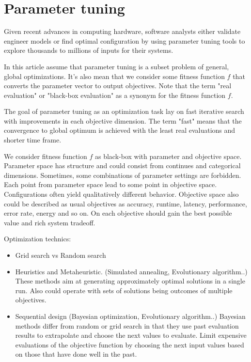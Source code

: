     \section{Parameter tuning}

        Given recent advances in computing hardware, software analysts either validate engineer models or find optimal configuration by using parameter tuning tools to explore thousands to millions of inputs for their systems. 

        In this article assume that parameter tuning is a subset problem of general, global optimizations. It's also mean that we consider some fitness function $f$ that converts the parameter vector to output objectives.  Note that the term "real evaluation" or "black-box evaluation" as a synonym for the fitness function $f$. 
        
        The goal of parameter tuning as an optimization task lay on fast iterative search with improvements in each objective dimension. The term "fast" means that the convergence to global optimum is achieved with the least real evaluations and shorter time frame.

        We consider fitness function $f$ as black-box with parameter and objective space. Parameter space has structure and could consist from continues and categorical dimensions. Sometimes, some combinations of parameter settings are forbidden. Each point from parameter space lead to some point in objective space. Configurations often yield qualitatively different behavior.
        Objective space also could be described as usual objectives as accuracy, runtime, latency, performance, error rate, energy and so on. On each objective should gain the best possible value and rich system tradeoff.

        Optimization technics:
        \begin{itemize}
            \item Grid search vs Random search
            \item Heuristics and Metaheuristic. (Simulated annealing, Evolutionary algorithm..) These methods aim at generating approximately optimal solutions in a single run. Also could operate with sets of solutions being outcomes of multiple objectives.
            \item Sequential design (Bayesian optimization, Evolutionary algorithm..) Bayesian methods differ from random or grid search in that they use past evaluation results to extrapolate and choose the next values to evaluate. Limit expensive evaluations of the objective function by choosing the next input values based on those that have done well in the past.
        \end{itemize}


